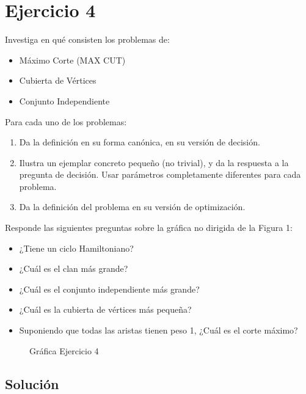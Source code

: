 \section{Ejercicio 4}

\begin{tcolorbox}[enunciado]
Investiga en qué consisten los problemas de:
\begin{itemize}
    \item Máximo Corte (MAX CUT)
    \item Cubierta de Vértices
    \item Conjunto Independiente
\end{itemize}
Para cada uno de los problemas:
\begin{enumerate}
    \item Da la definición en su forma canónica, en su versión de decisión.
    \item Ilustra un ejemplar concreto pequeño (no trivial), y da la respuesta a la pregunta de decisión. Usar parámetros completamente diferentes para cada problema.
    \item Da la definición del problema en su versión de optimización.
\end{enumerate}

Responde las siguientes preguntas sobre la gráfica no dirigida de la Figura 1:
\begin{itemize}
    \item ¿Tiene un ciclo Hamiltoniano?
    \item ¿Cuál es el clan más grande?
    \item ¿Cuál es el conjunto independiente más grande?
    \item ¿Cuál es la cubierta de vértices más pequeña?
    \item Suponiendo que todas las aristas tienen peso 1, ¿Cuál es el corte máximo?
\end{itemize}
\end{tcolorbox}

\begin{figure}[H]
    \centering
    \caption{Gráfica Ejercicio 4}
    \label{fig:ejercicio4}
\end{figure}

\subsection{Solución}

